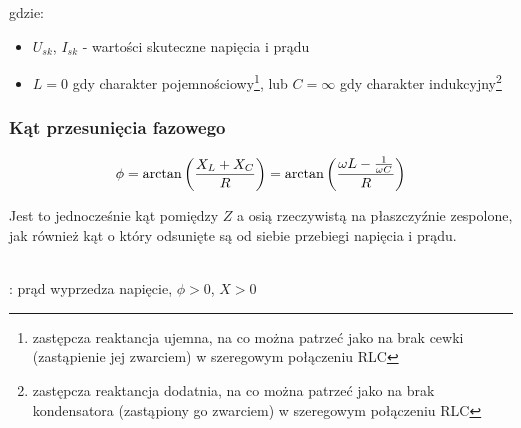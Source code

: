 \noindent
gdzie:
\begin{itemize}
	\item $U_{sk}$, $I_{sk}$ - wartości skuteczne napięcia i prądu
	\item $L = 0$ gdy charakter pojemnościowy\footnote{
		zastępcza reaktancja ujemna, na co można patrzeć jako na brak cewki (zastąpienie jej zwarciem) w szeregowym połączeniu RLC
	}, lub $C = \infty$ gdy charakter indukcyjny\footnote{
		zastępcza reaktancja dodatnia, na co można patrzeć jako na brak kondensatora (zastąpiony go zwarciem) w szeregowym połączeniu RLC
	}
\end{itemize}

\subsubsection{Kąt przesunięcia fazowego}

$$\phi = \arctan \left({X_L + X_C \over R}\right) = \arctan \left({\omega L - \frac{1}{\omega C} \over R} \right)$$

\noindent
Jest to jednocześnie kąt pomiędzy $Z$ a osią rzeczywistą na płaszczyźnie zespolone, jak również kąt o który odsunięte są od siebie przebiegi napięcia i prądu.

\begin{center} \begin{adjustbox}{scale=1.0}  \end{adjustbox}
\\: prąd wyprzedza napięcie, $\phi > 0$, $X > 0$
\end{center} \vspace{-0.3cm}

